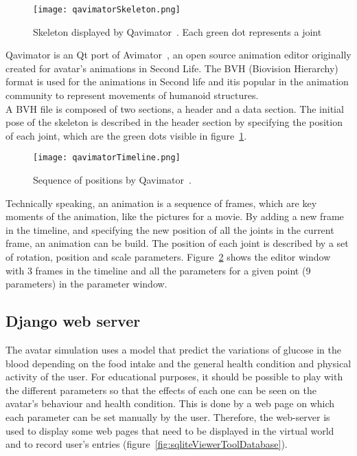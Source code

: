 \begin{figure}[h]
  \caption{Skeleton displayed by Qavimator~\cite{qavimatorWebsite}. Each green dot represents a joint}
  \centering
  \texttt{[image: qavimatorSkeleton.png]}
  \label{qavimatorSkeleton}
\end{figure}

Qavimator is an Qt port of Avimator~\cite{avimatorWebsite}, an open source animation editor originally created for avatar's animations in Second Life. The BVH (Biovision Hierarchy)~\cite{thingvold1999biovision} format is used for the animations in Second life and itis popular in the animation community to represent movements of humanoid structures. \\

A BVH file is composed of two sections, a header and a data section. The initial pose of the skeleton is described in the header section by specifying the position of each joint, which are the green dots visible in figure~\ref{qavimatorSkeleton}. \\

\begin{figure}[h]
  \caption{Sequence of positions by Qavimator~\cite{qavimatorWebsite}. }
  \centering
  \texttt{[image: qavimatorTimeline.png]}
  \label{qavimatorTimeline}
\end{figure}

Technically speaking, an animation is a sequence of frames, which are key moments of the animation, like the pictures for a movie.
By adding a new frame in the timeline, and specifying the new position of all the joints in the current frame, an animation can be build. The position of each joint is described by a set of rotation, position and scale parameters. Figure~\ref{qavimatorTimeline} shows the editor window with 3 frames in the timeline and all the parameters for a given point (9 parameters) in the parameter window.


\subsection{Django web server}
The avatar simulation uses a model that predict the variations of glucose in the blood depending on the food intake and the general health condition and  physical activity of the user. For educational purposes, it should be possible to play with the different parameters so that the effects of each one can be seen on the avatar's behaviour and health condition. This is done by a web page on which each parameter can be set manually by the user.
Therefore, the web-server is used to display some web pages that need to be displayed in the virtual world and to record user's entries (figure~\ref{fig:sqliteViewerToolDatabase}).\\



